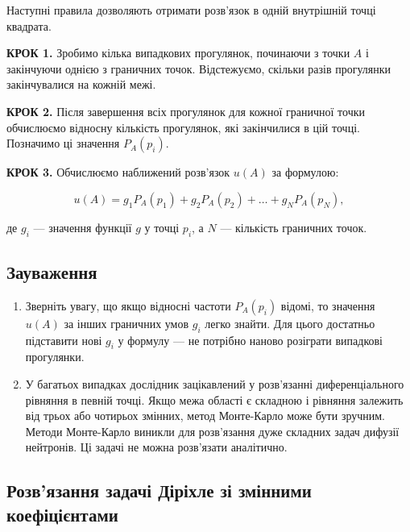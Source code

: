 \documentclass[
  ukrainian,
]{article}
\begin{document}
Наступні правила дозволяють отримати розв'язок в одній внутрішній точці
квадрата.

\textbf{КРОК 1.} Зробимо кілька випадкових прогулянок, починаючи з точки
\(A\) і закінчуючи однією з граничних точок. Відстежуємо, скільки разів
прогулянки закінчувалися на кожній межі.

\textbf{КРОК 2.} Після завершення всіх прогулянок для кожної граничної
точки обчислюємо відносну кількість прогулянок, які закінчилися в цій
точці. Позначимо ці значення \(P_A(p_i)\).

\textbf{КРОК 3.} Обчислюємо наближений розв'язок \(u(A)\) за формулою:

\[u(A) = g_1 P_A(p_1) + g_2 P_A(p_2) + \dots + g_N P_A(p_N),\]

де \(g_i\) --- значення функції \(g\) у точці \(p_i\), а \(N\) ---
кількість граничних точок.

\subsection{Зауваження}\label{ux437ux430ux443ux432ux430ux436ux435ux43dux43dux44f-14}

\begin{enumerate}
\def\labelenumi{\arabic{enumi}.}
\item
  Зверніть увагу, що якщо відносні частоти \(P_A(p_i)\) відомі, то
  значення \(u(A)\) за інших граничних умов \(g_i\) легко знайти. Для
  цього достатньо підставити нові \(g_i\) у формулу --- не потрібно
  наново розіграти випадкові прогулянки.
\item
  У багатьох випадках дослідник зацікавлений у розв'язанні
  диференціального рівняння в певній точці. Якщо межа області є складною
  і рівняння залежить від трьох або чотирьох змінних, метод Монте-Карло
  може бути зручним. Методи Монте-Карло виникли для розв'язання дуже
  складних задач дифузії нейтронів. Ці задачі не можна розв'язати
  аналітично.
\end{enumerate}

\subsection{Розв'язання задачі Діріхле зі змінними
коефіцієнтами}\label{ux440ux43eux437ux432ux44fux437ux430ux43dux43dux44f-ux437ux430ux434ux430ux447ux456-ux434ux456ux440ux456ux445ux43bux435-ux437ux456-ux437ux43cux456ux43dux43dux438ux43cux438-ux43aux43eux435ux444ux456ux446ux456ux454ux43dux442ux430ux43cux438}
\end{document}
